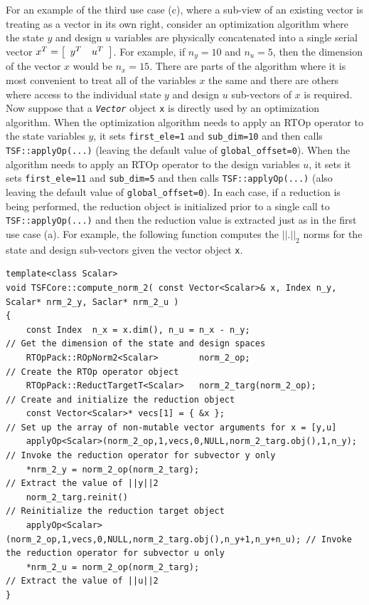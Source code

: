 \documentclass[10pt,fleqn]{article}
\begin{document}
For an example of the third use case (c), where a sub-view of an
existing vector is treating as a vector in its own right, consider an
optimization algorithm where the state $y$ and design $u$ variables
are physically concatenated into a single serial vector $x^T =
{\bmat{cc} y^T & u^T \emat}$.  For example, if $n_y = 10$ and $n_u =
5$, then the dimension of the vector $x$ would be $n_x = 15$.  There
are parts of the algorithm where it is most convenient to treat all of
the variables $x$ the same and there are others where access to the
individual state $y$ and design $u$ sub-vectors of $x$ is required.
Now suppose that a \texttt{\textit{Vector}} object \texttt{x} is
directly used by an optimization algorithm.  When the optimization
algorithm needs to apply an RTOp operator to the state variables $y$, it
sets \texttt{first\_ele=1} and \texttt{sub\_dim=10} and then calls
\texttt{TSF::applyOp(...)} (leaving the default value of
\texttt{global\_offset=0}).  When the algorithm needs to apply an
RTOp operator to the design variables $u$, it sets it sets
\texttt{first\_ele=11} and \texttt{sub\_dim=5} and then calls
\texttt{TSF::applyOp(...)} (also leaving the default value of
\texttt{global\_offset=0}).  In each case, if a reduction is being performed,
the reduction object is initialized prior to a single call to
\texttt{TSF::applyOp(...)} and then the reduction value is extracted
just as in the first use case (a).  For example, the following
function computes the $||.||_2$ norms for the state and design
sub-vectors given the vector object \texttt{x}.

{\scriptsize\begin{verbatim}
template<class Scalar>
void TSFCore::compute_norm_2( const Vector<Scalar>& x, Index n_y, Scalar* nrm_2_y, Saclar* nrm_2_u )
{
    const Index  n_x = x.dim(), n_u = n_x - n_y;                              // Get the dimension of the state and design spaces
    RTOpPack::ROpNorm2<Scalar>        norm_2_op;                              // Create the RTOp operator object
    RTOpPack::ReductTargetT<Scalar>   norm_2_targ(norm_2_op);                 // Create and initialize the reduction object
    const Vector<Scalar>* vecs[1] = { &x };                                   // Set up the array of non-mutable vector arguments for x = [y,u]
    applyOp<Scalar>(norm_2_op,1,vecs,0,NULL,norm_2_targ.obj(),1,n_y);         // Invoke the reduction operator for subvector y only
    *nrm_2_y = norm_2_op(norm_2_targ);                                        // Extract the value of ||y||2
    norm_2_targ.reinit()                                                      // Reinitialize the reduction target object
    applyOp<Scalar>(norm_2_op,1,vecs,0,NULL,norm_2_targ.obj(),n_y+1,n_y+n_u); // Invoke the reduction operator for subvector u only
    *nrm_2_u = norm_2_op(norm_2_targ);                                        // Extract the value of ||u||2
}
\end{verbatim}}
\end{document}

